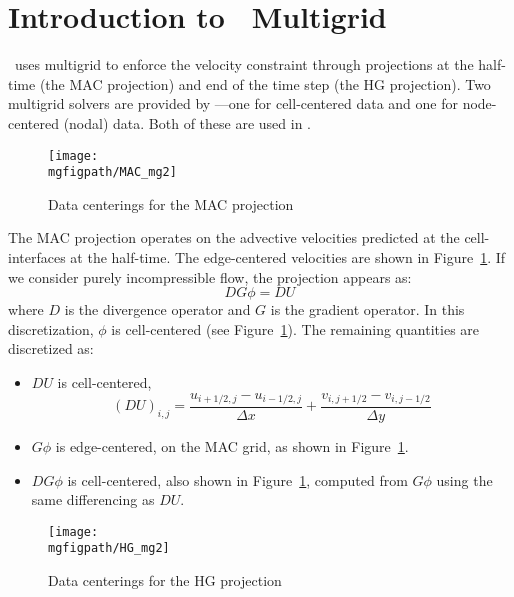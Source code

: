 \label{ch:mg}

\section{Introduction to \maestro\ Multigrid}

\maestro\ uses multigrid to enforce the velocity constraint through
projections at the half-time (the MAC projection) and end of the time
step (the HG projection).  Two multigrid solvers are provided by
\boxlib---one for cell-centered data and one for node-centered (nodal)
data.  Both of these are used in \maestro.

\begin{figure}[t]
\centering
\texttt{[image: \\mgfigpath/MAC\_mg2]}
\caption{\label{fig:mg:MAC} Data centerings for the MAC projection}
\end{figure}

The MAC projection operates on the advective velocities predicted at
the cell-interfaces at the half-time.  The edge-centered velocities
are shown in Figure~\ref{fig:mg:MAC}.  If we consider purely
incompressible flow, the projection appears as:
\begin{equation}
D G \phi = D U
\end{equation}
where $D$ is the divergence operator and $G$ is the gradient operator.
In this discretization, $\phi$ is cell-centered (see
Figure~\ref{fig:mg:MAC}).  The remaining quantities are discretized as:
\begin{itemize}
\item $DU$ is cell-centered, 
  \begin{equation}
  (DU)_{i,j} = \frac{u_{i+1/2,j} - u_{i-1/2,j}}{\Delta x} + 
               \frac{v_{i,j+1/2} - v_{i,j-1/2}}{\Delta y}
  \end{equation}

\item $G\phi$ is edge-centered, on the MAC grid, as shown in
  Figure~\ref{fig:mg:MAC}.

\item $DG\phi$ is cell-centered, also shown in Figure~\ref{fig:mg:MAC},
  computed from $G\phi$ using the same differencing as $DU$.

\end{itemize}

\begin{figure}[t]
\centering
\texttt{[image: \\mgfigpath/HG\_mg2]}
\caption{\label{fig:mg:HG} Data centerings for the HG projection}
\end{figure}

